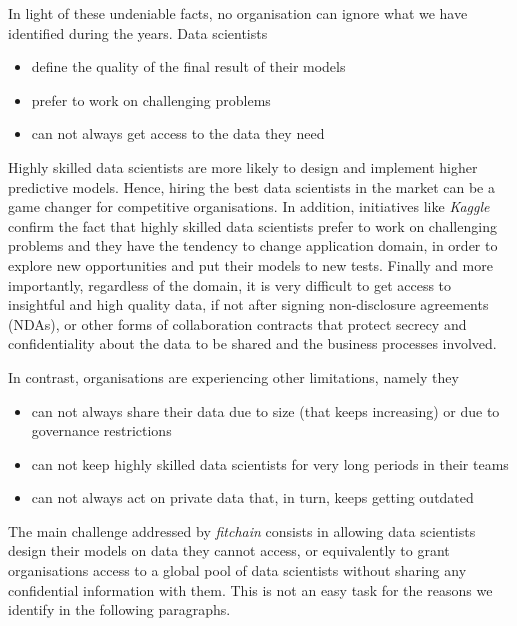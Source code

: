 \documentclass[12pt, a4paper,titlepage]{extreport}
\begin{document}
In light of these undeniable facts, no organisation can ignore what we have identified during the years. Data scientists

\begin{itemize}
\item define the quality of the final result of their models
\item prefer to work on challenging problems
\item can not always get access to the data they need
\end{itemize}

Highly skilled data scientists are more likely to design and implement higher predictive models. Hence, hiring the best data scientists in the market can be a game changer for competitive organisations. In addition, initiatives like \textit{Kaggle} \cite{kaggle} confirm the fact that highly skilled data scientists prefer to work on challenging problems and they have the tendency to change application domain, in order to explore new opportunities and put their models to new tests.
Finally and more importantly, regardless of the domain, it is very difficult to get access to insightful and high quality data, if not after signing non-disclosure agreements (NDAs), or other forms of collaboration contracts that protect secrecy and confidentiality about the data to be shared and the business processes involved.

In contrast, organisations are experiencing other limitations, namely they

\begin{itemize}
\item can not always share their data due to size (that keeps increasing) or due to governance restrictions
\item can not keep highly skilled data scientists for very long periods in their teams
\item can not always act on private data that, in turn, keeps getting outdated 
\end{itemize}

The main challenge addressed by \textit{fitchain} consists in allowing data scientists  design their models on data they cannot access, or equivalently to grant organisations access to a global pool of data scientists without sharing any confidential information with them. 
This is not an easy task for the reasons we identify in the following paragraphs. 

\end{document}

